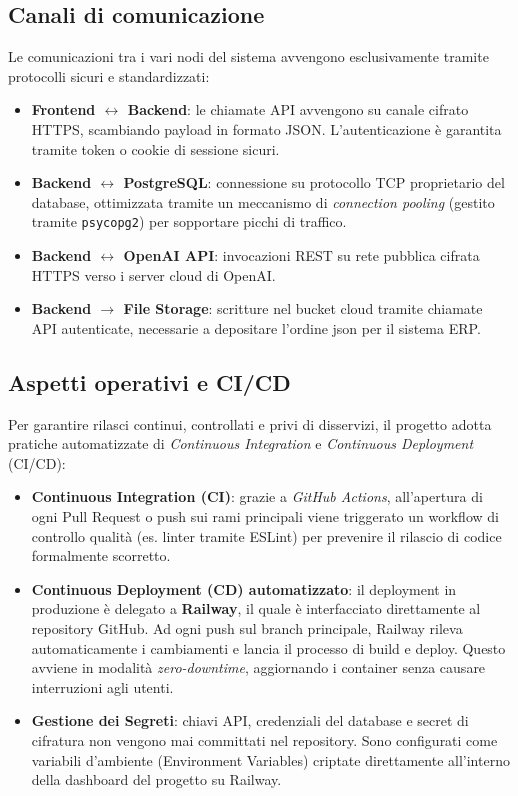 \documentclass[a4paper, 11pt, oneside]{scrartcl}
\begin{document}
\subsection{Canali di comunicazione}
Le comunicazioni tra i vari nodi del sistema avvengono esclusivamente tramite protocolli sicuri e standardizzati:
\begin{itemize}
    \item \textbf{Frontend $\leftrightarrow$ Backend}: le chiamate API avvengono su canale cifrato HTTPS, scambiando payload in formato JSON. L'autenticazione è garantita tramite token o cookie di sessione sicuri.
    \item \textbf{Backend $\leftrightarrow$ PostgreSQL}: connessione su protocollo TCP proprietario del database, ottimizzata tramite un meccanismo di \textit{connection pooling} (gestito tramite \texttt{psycopg2}) per sopportare picchi di traffico.
    \item \textbf{Backend $\leftrightarrow$ OpenAI API}: invocazioni REST su rete pubblica cifrata HTTPS verso i server cloud di OpenAI.
    \item \textbf{Backend $\rightarrow$ File Storage}: scritture nel bucket cloud tramite chiamate API autenticate, necessarie a depositare l'ordine json per il sistema ERP.
\end{itemize}

\subsection{Aspetti operativi e CI/CD}
Per garantire rilasci continui, controllati e privi di disservizi, il progetto adotta pratiche automatizzate di \textit{Continuous Integration} e \textit{Continuous Deployment} (CI/CD):
\begin{itemize}
    \item \textbf{Continuous Integration (CI)}: grazie a \textit{GitHub Actions}, all'apertura di ogni Pull Request o push sui rami principali viene triggerato un workflow di controllo qualità (es. linter tramite ESLint) per prevenire il rilascio di codice formalmente scorretto.
    \item \textbf{Continuous Deployment (CD) automatizzato}: il deployment in produzione è delegato a \textbf{Railway}, il quale è interfacciato direttamente al repository GitHub. Ad ogni push sul branch principale, Railway rileva automaticamente i cambiamenti e lancia il processo di build e deploy. Questo avviene in modalità \textit{zero-downtime}, aggiornando i container senza causare interruzioni agli utenti.
    \item \textbf{Gestione dei Segreti}: chiavi API, credenziali del database e secret di cifratura non vengono mai committati nel repository. Sono configurati come variabili d'ambiente (Environment Variables) criptate direttamente all'interno della dashboard del progetto su Railway.
\end{itemize}
\end{document}

